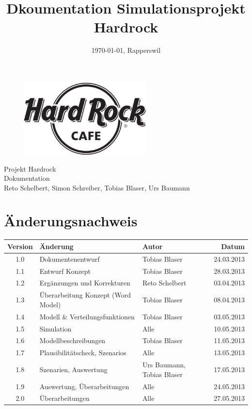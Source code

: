 \documentclass[ngerman,a4paper,12pt]{scrreprt}
\title{Dkoumentation Simulationsprojekt Hardrock}
\date{\today{}, Rapperswil}
\def\author{Reto Schelbert, Simon Schreiber, Tobias Blaser, Urs Baumann}
\begin{document}
\thispagestyle{empty}
\begin{titlepage}
	\begin{center}

	\vspace*{40mm}
	
	\begin{figure}[htp]
		\centering
		\includegraphics[width=0.60\textwidth]{img/Hard-Rock-Cafe-Logo-Black-White.png}
	\end{figure}		
	\vspace*{20mm}
	
	{\fontsize{40}{48} \selectfont Projekt Hardrock \\[10mm]}
	{\fontsize{32}{48} \selectfont Dokumentation \\[5mm]}	
	\vspace*{20mm}
	\author

\end{center}
\end{titlepage}
\clearpage

\chapter*{Änderungsnachweis}
\begin{tabularx}{\textwidth}{|cXlr|} %
		\hline
		\textbf{Version} & \textbf{Änderung} & \textbf{Autor} & \textbf{Datum}\\
		\hline
		1.0 & Dokumentenentwurf & Tobias Blaser & 24.03.2013 \\
		1.1 & Entwurf Konzept & Tobias Blaser & 28.03.2013 \\
		1.2 & Ergänzungen und Korrekturen & Reto Schelbert & 03.04.2013 \\
		1.3 & Überarbeitung Konzept (Word Model) & Tobias Blaser & 08.04.2013 \\
		1.4 & Modell \& Verteilungsfunktionen & Tobias Blaser & 03.05.2013 \\
		1.5 & Simulation & Alle & 10.05.2013 \\
		1.6 & Modellbeschreibungen & Tobias Blaser & 11.05.2013\\
		1.7 & Plausibilitätscheck, Szenarios & Alle & 13.05.2013\\
		1.8 & Szenarien, Auswertung & Urs Baumann, Tobias Blaser & 17.05.2013\\
		1.9 & Auswertung, Überarbeitungen & Alle & 24.05.2013\\
		2.0 & Überarbeitungen & Alle & 27.05.2013\\
		\hline
\end{tabularx}
\end{document}
